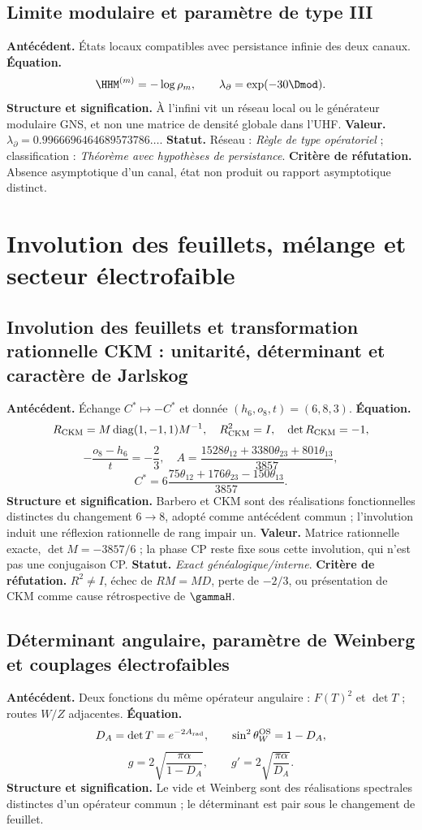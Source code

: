\subsection*{Limite modulaire et paramètre de type III }
\textbf{Antécédent.} États locaux compatibles avec persistance infinie des
deux canaux. \textbf{Équation.}
\[
\HHM^{(m)}=-\log\rho_m,
\qquad
\lambda_\partial=\exp(-30\Dmod).
\]
\textbf{Structure et signification.} À l'infini vit un réseau local ou le
générateur modulaire GNS, et non une matrice de densité globale dans l'UHF.
\textbf{Valeur.}
\(\lambda_\partial=0.9966696464689573786\ldots\).
\textbf{Statut.} Réseau : \emph{Règle de type opératoriel} ; classification :
\emph{Théorème avec hypothèses de persistance}. \textbf{Critère de réfutation.} Absence
asymptotique d'un canal, état non produit ou rapport asymptotique distinct.

\section{Involution des feuillets, mélange et secteur électrofaible}

\subsection*{Involution des feuillets et transformation rationnelle CKM : unitarité, déterminant et caractère de Jarlskog}
\textbf{Antécédent.} Échange \(C^*\mapsto-C^*\) et donnée
\((h_6,o_8,t)=(6,8,3)\). \textbf{Équation.}
\[
R_{\rm CKM}=M\operatorname{diag}(1,-1,1)M^{-1},
\quad R_{\rm CKM}^2=I,\quad\det R_{\rm CKM}=-1,
\]
\[
-\frac{o_8-h_6}{t}=-\frac23,
\quad
A=\frac{1528\theta_{12}+3380\theta_{23}+801\theta_{13}}{3857},
\]
\[
C^*=6\frac{75\theta_{12}+176\theta_{23}-150\theta_{13}}{3857}.
\]
\textbf{Structure et signification.} Barbero et CKM sont des réalisations
fonctionnelles distinctes du changement \(6\to8\), adopté comme antécédent
commun ; l'involution induit une réflexion rationnelle de rang impair un.
\textbf{Valeur.} Matrice rationnelle exacte, \(\det M=-3857/6\) ; la phase CP
reste fixe sous cette involution, qui n'est pas une conjugaison CP.
\textbf{Statut.} \emph{Exact généalogique/interne}.
\textbf{Critère de réfutation.} \(R^2\ne I\), échec de \(RM=MD\), perte de
\(-2/3\), ou présentation de CKM comme cause rétrospective de \(\gammaH\).

\subsection*{Déterminant angulaire, paramètre de Weinberg et couplages électrofaibles}
\textbf{Antécédent.} Deux fonctions du même opérateur angulaire :
\(F(T)^2\) et \(\det T\) ; routes \(W/Z\) adjacentes.
\textbf{Équation.}
\[
D_A=\det T=e^{-2A_{\rm rad}},
\qquad \sin^2\theta_W^{\rm OS}=1-D_A,
\]
\[
g=2\sqrt{\frac{\pi\alpha}{1-D_A}},
\qquad g'=2\sqrt{\frac{\pi\alpha}{D_A}}.
\]
\textbf{Structure et signification.} Le vide et Weinberg sont des réalisations
spectrales distinctes d'un opérateur commun ; le déterminant est pair sous le
changement de feuillet.

